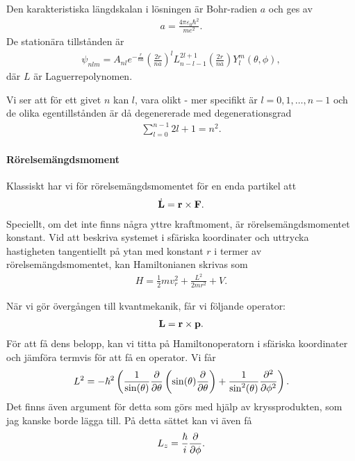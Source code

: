 Den karakteristiska längdskalan i lösningen är Bohr-radien $a$ och ges av
\begin{align*}
	a = \frac{4\pi\varepsilon_{0}\hbar^{2}}{me^{2}}.
\end{align*}
De stationära tillstånden är
\begin{align*}
	\psi_{nlm} = A_{nl}e^{-\frac{r}{na}}\left(\frac{2r}{na}\right)^{l}L_{n - l - 1}^{2l + 1}\left(\frac{2r}{na}\right)Y_{l}^{m}(\theta, \phi),
\end{align*}
där $L$ är Laguerrepolynomen.

Vi ser att för ett givet $n$ kan $l$, vara olikt - mer specifikt är $l = 0, 1, \dots, n - 1$ och de olika egentillstånden är då degenererade med degenerationsgrad
\begin{align*}
	\sum\limits_{l = 0}^{n - 1}2l + 1 = n^{2}.
\end{align*}

\paragraph{Rörelsemängdsmoment}
Klassiskt har vi för rörelsemängdsmomentet för en enda partikel att
\begin{align*}
	\dot{\vb{L}} = \vb{r}\times\vb{F}.
\end{align*}
Speciellt, om det inte finns några yttre kraftmoment, är rörelsemängdsmomentet konstant. Vid att beskriva systemet i sfäriska koordinater och uttrycka hastigheten tangentiellt på ytan med konstant $r$ i termer av rörelsemängdsmomentet, kan Hamiltonianen skrivas som
\begin{align*}
	H = \frac{1}{2}mv_{r}^{2} + \frac{L^{2}}{2mr^{2}} + V.
\end{align*}

När vi gör övergången till kvantmekanik, får vi följande operator:
\begin{align*}
	\vb{L} = \vb{r}\times\vb{p}.
\end{align*}
För att få dens belopp, kan vi titta på Hamiltonoperatorn i sfäriska koordinater och jämföra termvis för att få en operator. Vi får
\begin{align*}
	L^{2} = -\hbar^{2}\left(\frac{1}{\sin(\theta)}\pdv{\theta}\left(\sin(\theta)\pdv{\theta}\right) + \frac{1}{\sin^{2}(\theta)}\pdv[2]{\phi}\right).
\end{align*}
Det finns även argument för detta som görs med hjälp av kryssprodukten, som jag kanske borde lägga till. På detta sättet kan vi även få
\begin{align*}
	L_{z} = \frac{\hbar}{i}\pdv{\phi}.
\end{align*}

